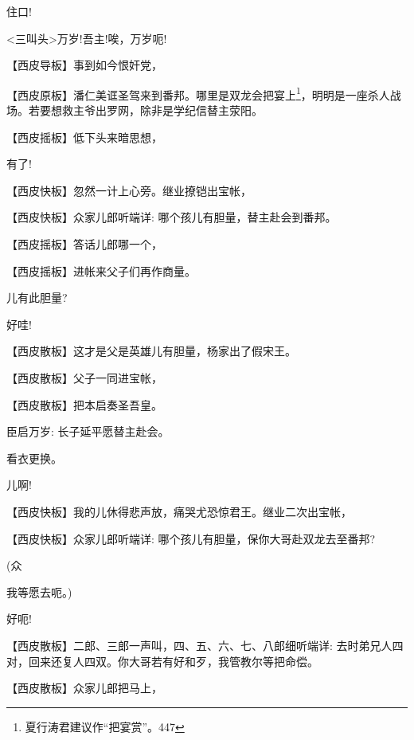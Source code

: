 {住口!}

{\textless{}三叫头\textgreater{}万岁!吾主!唉，万岁呃!}

\setlength{\hangindent}{60pt} {【{\akai 西皮导板}】事到如今恨奸党，}

\setlength{\hangindent}{60pt} {【{\akai 西皮原板}】潘仁美诓圣驾来到番邦。哪里是双龙会把宴上}\footnote{ 夏行涛君建议作``把宴赏''。{447}}{，明明是一座杀人战场。若要想救主爷出罗网，除非是学纪信替主荥阳。}

\setlength{\hangindent}{60pt} {【{\akai 西皮摇板}】低下头来暗思想，}

{有了!}

\setlength{\hangindent}{60pt} {【{\akai 西皮快板}】忽然一计上心旁。继业撩铠出宝帐，}

\setlength{\hangindent}{60pt} {【{\akai 西皮快板}】众家儿郎听端详: 哪个孩儿有胆量，替主赴会到番邦。}

\setlength{\hangindent}{60pt} {【{\akai 西皮摇板}】答话儿郎哪一个，}

\setlength{\hangindent}{60pt} {【{\akai 西皮摇板}】进帐来父子们再作商量。}

{儿有此胆量?}

{好哇!}

\setlength{\hangindent}{60pt} {【{\akai 西皮散板}】这才是父是英雄儿有胆量，杨家出了假宋王。}

\setlength{\hangindent}{60pt} {【{\akai 西皮散板}】父子一同进宝帐，}

\setlength{\hangindent}{60pt} {【{\akai 西皮散板}】把本启奏圣吾皇。}

{臣启万岁: 长子延平愿替主赴会。}

{看衣更换。}

{儿啊!}

\setlength{\hangindent}{60pt} {【{\akai 西皮快板}】我的儿休得悲声放，痛哭尤恐惊君王。继业二次出宝帐，}

\setlength{\hangindent}{60pt} {【{\akai 西皮快板}】众家儿郎听端详: 哪个孩儿有胆量，保你大哥赴双龙去至番邦?}

{(众\hspace{40pt}~

我等愿去呃。)}

{好呃!}

\setlength{\hangindent}{60pt} {【{\akai 西皮散板}】二郎、三郎一声叫，四、五、六、七、八郎细听端详: 去时弟兄人四对，回来还复人四双。你大哥若有好和歹，我管教尔等把命偿。}

\setlength{\hangindent}{60pt} {【{\akai 西皮散板}】众家儿郎把马上，}

